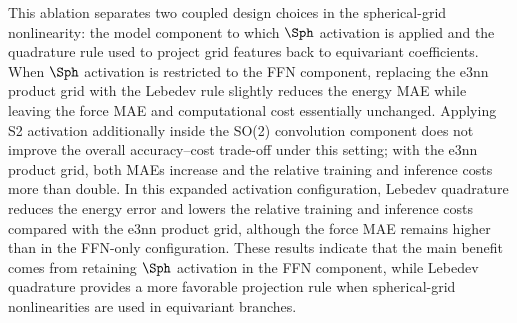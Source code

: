 This ablation separates two coupled design choices in the spherical-grid
nonlinearity: the model component to which $\Sph$ activation is applied and the
quadrature rule used to project grid features back to equivariant coefficients.
When $\Sph$ activation is restricted to the FFN component, replacing the e3nn
product grid with the Lebedev rule slightly reduces the energy MAE while
leaving the force MAE and computational cost essentially unchanged. Applying S2
activation additionally inside the SO(2) convolution component does not improve
the overall accuracy--cost trade-off under this setting; with the e3nn product
grid, both MAEs increase and the relative training and inference costs more
than double. In this expanded activation configuration, Lebedev quadrature
reduces the energy error and lowers the relative training and inference costs
compared with the e3nn product grid, although the force MAE remains higher than
in the FFN-only configuration. These results indicate that the main benefit
comes from retaining $\Sph$ activation in the FFN component, while Lebedev
quadrature provides a more favorable projection rule when spherical-grid
nonlinearities are used in equivariant branches.

